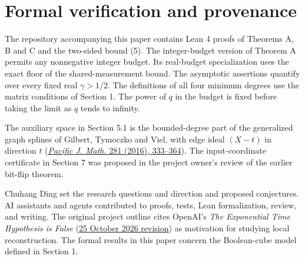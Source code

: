 \documentclass[
  10pt,
]{article}
\begin{document}
\section*{Formal verification and provenance}
The repository accompanying this paper contains Lean 4 proofs of Theorems A, B and C and the two-sided bound (5). The integer-budget version of Theorem A permits any nonnegative integer budget. Its real-budget specialization uses the exact floor of the shared-measurement bound. The asymptotic assertions quantify over every fixed real \(\gamma>1/2\).
The definitions of all four minimum degrees use the matrix conditions of Section 1.
The power of \(q\) in the budget is fixed before taking the limit as \(q\) tends to infinity.

The auxiliary space in Section 5.1 is the bounded-degree part of the generalized graph splines of Gilbert, Tymoczko and Viel, with edge ideal \((X-t)\) in direction \(t\) (\href{https://doi.org/10.2140/pjm.2016.281.333}{\emph{Pacific J. Math.} 281 (2016), 333--364}). The input-coordinate certificate in Section 7 was proposed in the project owner's review of the earlier bit-flip theorem.

Chuhang Ding set the research questions and direction and proposed conjectures. AI assistants and agents contributed to proofs, tests, Lean formalization, review, and writing. The original project outline cites OpenAI's \emph{The Exponential Time Hypothesis is False} (\href{https://github.com/openai/math/tree/main/preprints/The-Exponential-Time-Hypothesis-is-False-October-25-2026}{25 October 2026 revision}) as motivation for studying local reconstruction. The formal results in this paper concern the Boolean-cube model defined in Section 1.
\end{document}
